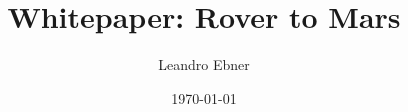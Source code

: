 \documentclass[type=bachelor,twoside,BCOR=1cm]{rwuthesis}
\title{Whitepaper: Rover to Mars}
\author{Leandro Ebner}
\date{\today}
\begin{document}
\maketitle
\tableofcontents



\lipsum
\end{document}
